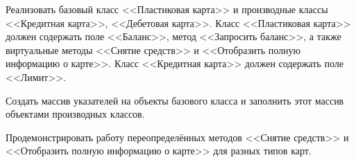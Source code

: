 Реализовать базовый класс <<Пластиковая карта>> и
производные классы <<Кредитная карта>>, <<Дебетовая карта>>.
Класс <<Пластиковая карта>> должен содержать поле
<<Баланс>>, метод <<Запросить баланс>>, а также виртуальные
методы <<Снятие средств>> и <<Отобразить полную
информацию о карте>>.
Класс <<Кредитная карта>> должен
содержать поле <<Лимит>>.

Создать массив указателей на
объекты базового класса и заполнить этот массив объектами
производных классов.

Продемонстрировать работу
переопределённых методов <<Снятие средств>> и <<Отобразить
полную информацию о карте>> для разных типов карт.




